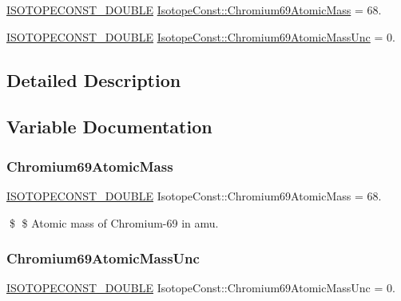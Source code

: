 \begin{DoxyCompactItemize}
\item 
\mbox{\hyperlink{group___isotope_const-_macros_ga8f45a7272ce02c0b4c65c44636ed719a}{I\+S\+O\+T\+O\+P\+E\+C\+O\+N\+S\+T\+\_\+\+D\+O\+U\+B\+LE}} \mbox{\hyperlink{group___isotope_const-_chromium-_cr69_gaa8d22fa32f15eaed9ed65a9b4fb19ea4}{Isotope\+Const\+::\+Chromium69\+Atomic\+Mass}} = 68.
\item 
\mbox{\hyperlink{group___isotope_const-_macros_ga8f45a7272ce02c0b4c65c44636ed719a}{I\+S\+O\+T\+O\+P\+E\+C\+O\+N\+S\+T\+\_\+\+D\+O\+U\+B\+LE}} \mbox{\hyperlink{group___isotope_const-_chromium-_cr69_gab4cfa3bfb616d73a605efb3e05a6eaaf}{Isotope\+Const\+::\+Chromium69\+Atomic\+Mass\+Unc}} = 0.
\end{DoxyCompactItemize}


\subsection{Detailed Description}


\subsection{Variable Documentation}
\mbox{\label{group___isotope_const-_chromium-_cr69_gaa8d22fa32f15eaed9ed65a9b4fb19ea4}} 
\subsubsection{\texorpdfstring{Chromium69\+Atomic\+Mass}{Chromium69AtomicMass}}
{\footnotesize\ttfamily \mbox{\hyperlink{group___isotope_const-_macros_ga8f45a7272ce02c0b4c65c44636ed719a}{I\+S\+O\+T\+O\+P\+E\+C\+O\+N\+S\+T\+\_\+\+D\+O\+U\+B\+LE}} Isotope\+Const\+::\+Chromium69\+Atomic\+Mass = 68.}

\$ \$ Atomic mass of Chromium-\/69 in amu. \mbox{\label{group___isotope_const-_chromium-_cr69_gab4cfa3bfb616d73a605efb3e05a6eaaf}} 
\subsubsection{\texorpdfstring{Chromium69\+Atomic\+Mass\+Unc}{Chromium69AtomicMassUnc}}
{\footnotesize\ttfamily \mbox{\hyperlink{group___isotope_const-_macros_ga8f45a7272ce02c0b4c65c44636ed719a}{I\+S\+O\+T\+O\+P\+E\+C\+O\+N\+S\+T\+\_\+\+D\+O\+U\+B\+LE}} Isotope\+Const\+::\+Chromium69\+Atomic\+Mass\+Unc = 0.}

